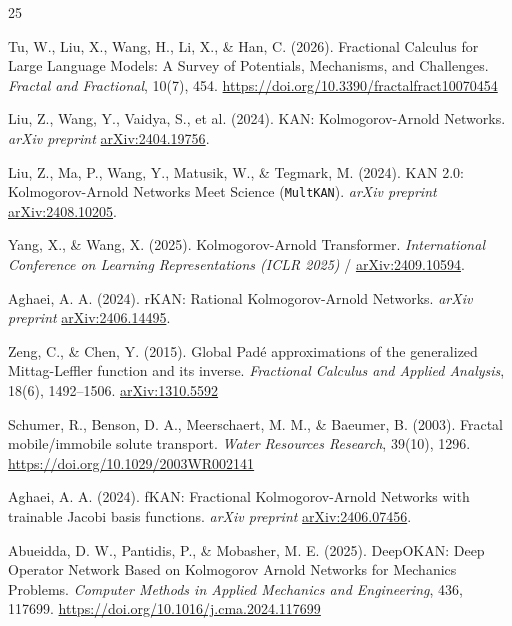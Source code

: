 \documentclass[10pt,twocolumn,a4paper]{article}
\begin{document}
\clearpage
\begin{thebibliography}{25}
\footnotesize
\setlength{\itemsep}{1.5pt}

Tu, W., Liu, X., Wang, H., Li, X., \& Han, C. (2026). Fractional Calculus for Large Language Models: A Survey of Potentials, Mechanisms, and Challenges. \textit{Fractal and Fractional}, 10(7), 454. \href{https://doi.org/10.3390/fractalfract10070454}{https://doi.org/10.3390/fractalfract10070454}

Liu, Z., Wang, Y., Vaidya, S., et al. (2024). KAN: Kolmogorov-Arnold Networks. \textit{arXiv preprint} \href{https://arxiv.org/abs/2404.19756}{arXiv:2404.19756}.

Liu, Z., Ma, P., Wang, Y., Matusik, W., \& Tegmark, M. (2024). KAN 2.0: Kolmogorov-Arnold Networks Meet Science (\texttt{MultKAN}). \textit{arXiv preprint} \href{https://arxiv.org/abs/2408.10205}{arXiv:2408.10205}.

Yang, X., \& Wang, X. (2025). Kolmogorov-Arnold Transformer. \textit{International Conference on Learning Representations (ICLR 2025)} / \href{https://arxiv.org/abs/2409.10594}{arXiv:2409.10594}.

Aghaei, A. A. (2024). rKAN: Rational Kolmogorov-Arnold Networks. \textit{arXiv preprint} \href{https://arxiv.org/abs/2406.14495}{arXiv:2406.14495}.

Zeng, C., \& Chen, Y. (2015). Global Pad\'e approximations of the generalized Mittag-Leffler function and its inverse. \textit{Fractional Calculus and Applied Analysis}, 18(6), 1492--1506. \href{https://arxiv.org/abs/1310.5592}{arXiv:1310.5592}

Schumer, R., Benson, D. A., Meerschaert, M. M., \& Baeumer, B. (2003). Fractal mobile/immobile solute transport. \textit{Water Resources Research}, 39(10), 1296. \href{https://doi.org/10.1029/2003WR002141}{https://doi.org/10.1029/2003WR002141}

Aghaei, A. A. (2024). fKAN: Fractional Kolmogorov-Arnold Networks with trainable Jacobi basis functions. \textit{arXiv preprint} \href{https://arxiv.org/abs/2406.07456}{arXiv:2406.07456}.

Abueidda, D. W., Pantidis, P., \& Mobasher, M. E. (2025). DeepOKAN: Deep Operator Network Based on Kolmogorov Arnold Networks for Mechanics Problems. \textit{Computer Methods in Applied Mechanics and Engineering}, 436, 117699. \href{https://doi.org/10.1016/j.cma.2024.117699}{https://doi.org/10.1016/j.cma.2024.117699}


\end{thebibliography}
\end{document}
